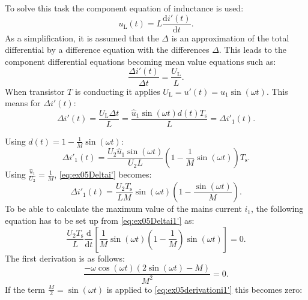 
\begin{solutionblock}
    To solve this task the component equation of inductance is used:
    \begin{equation}
        u_{\mathrm{L}}(t) = L \frac{\mathrm{d}i'(t)}{\mathrm{d}t}.
    \end{equation}
    As a simplification, it is assumed that the $\Delta$ is an approximation of the total differential by a difference equation with the differences $\Delta$. This leads to the component differential equations becoming mean value equations such as:
    \begin{equation}
        \frac{\Delta i'(t)}{\Delta t} = \frac{U_{\mathrm{L}}}{L}.
    \end{equation}
    When transistor $T$ is conducting it applies $U_{\mathrm{L}} = u'(t) = \hat u_{\mathrm{1}} \sin(\omega t)$.
    This means for $\Delta i'(t)$:
\begin{equation}
    \Delta i'(t) = \frac{ U_{\mathrm{L}} \Delta t}{L} = \frac{\hat u_{\mathrm{1}} \sin(\omega t) d(t) T_{\mathrm{s}}}{L} = \Delta i'_{\mathrm{1}}(t).
\end{equation}

Using $d(t) = 1 -\frac{1}{M} \sin(\omega t)$:
 \begin{equation}
     \Delta i'_{\mathrm{1}}(t) = \frac{U_{\mathrm{2}}\hat u_{\mathrm{1}}\sin (\omega t)}{U_{\mathrm{2}}L}(1-\frac{1}{M}\sin(\omega t)) T_{\mathrm{s}}\label{eq:ex05Deltai'}.
 \end{equation}
 Using $\frac{\hat u_{\mathrm{1}}}{U_{\mathrm{2}}} = \frac{1}{M}$, \eqref{eq:ex05Deltai'} becomes:
 \begin{equation}
     \Delta i'_{\mathrm{1}}(t) = \frac{U_{\mathrm{2}}T_{\mathrm{s}}}{LM}\sin (\omega t)(1-\frac{\sin(\omega t)}{M}). \label{eq:ex05Deltai1'}
 \end{equation}
   To be able to calculate the maximum value of the mains current
    $i_\mathrm{1}$, the following equation has to be set up from \eqref{eq:ex05Deltai1'} as:
    \begin{equation}
        \frac{U_{\mathrm{2}}T_{\mathrm{s}}}{L} \frac{\mathrm{d}}{\mathrm{d}t}\left[\frac{1}{M}\sin(\omega t)\left(1-\frac{1}{M}\right)\sin(\omega t)\right] =0.
    \end{equation}
    The first derivation is as follows:
    \begin{equation}
        \frac{-\omega \cos(\omega t)(2\sin(\omega t)-M)}{M^2}=0.\label{eq:ex05derivationi1'}
    \end{equation}
    If the term $\frac{M}{2}=\sin(\omega t)$ is applied to \eqref{eq:ex05derivationi1'} this becomes zero:


\end{solutionblock}
